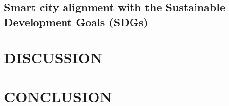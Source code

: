 \documentclass[a4paper,fleqn,spanish]{cas-dc}
\begin{document}


\subsection{Smart city alignment with the Sustainable Development Goals (SDGs)}\label{sustentabilidad}


\section{DISCUSSION}\label{discusion}



\section{CONCLUSION}\label{conclucion}





%
%

%



%
\end{document}
